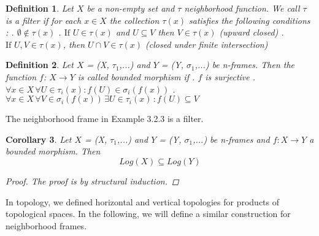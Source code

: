 \documentclass[12pt, a4paper]{scrartcl}
\newtheorem{definition}{Definition}[subsection]
\newtheorem{corollary}[definition]{Corollary}
\begin{document}
\begin{definition}
    Let $X$ be a non-empty set and $\tau$ neighborhood function. We call $\tau$ is a filter if for each $x\in X$ the collection $\tau(x)$
    satisfies the following conditions : \newline {}. $\emptyset \notin \tau(x)$ . $\mbox{If }U \in \tau(x)$ and $U \subseteq V$ then $V \in \tau(x)$ (upward closed) . $\mbox{If }U, V \in \tau(x)$, then $U \cap V \in \tau(x)$ (closed under finite intersection)
\end{definition}

\begin{definition}
    Let $X$ = (X, $\tau_1$,...) and $Y$ = (Y, $\sigma_1$,...) be n-frames. Then the function $f$:
    $X \rightarrow Y$ is called bounded morphism if \newline {}. $f$ is surjective . $\forall x\in X \, \forall U \in \tau_i(x) : f(U) \in \sigma_i (f(x))$ . $\forall x\in X \, \forall V \in \sigma_i (f(x)) \, \exists U \in \tau_i(x) \, : f(U) \subseteq V$ \newline 
\end{definition}
    The neighborhood frame in Example 3.2.3 is a filter.

\begin{corollary}
     Let $X$ = (X, $\tau_1$,...) and $Y$ = (Y, $\sigma_1$,...) be n-frames and $f : X \rightarrow Y$ a bounded morphism. Then 
     $$Log(X) \subseteq Log(Y)$$
     \begin{proof}
        The proof is by structural induction.
     \end{proof}
\end{corollary}

In topology, we defined horizontal and vertical topologies for products of topological spaces.
 In the following, we will define a similar construction for neighborhood frames.
\end{document}
